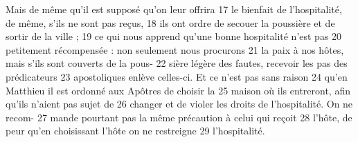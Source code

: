 Mais de même qu'il est supposé qu'on leur offrira	 
17	 	le bienfait de l'hospitalité, de même, s'ils ne sont pas reçus,	 
18	 	ils ont ordre de secouer la poussière et de sortir de la ville ;	 
19	 	ce qui nous apprend qu'une bonne hospitalité n'est pas	 
20	 	petitement récompensée : non seulement nous procurons	 
21	 	la paix à nos hôtes, mais s'ils sont couverts de la pous-	 
22	 	sière légère des fautes, recevoir les pas des prédicateurs	 
23	 	apostoliques enlève celles-ci. Et ce n'est pas sans raison	 
24	 	qu'en Matthieu il est ordonné aux Apôtres de choisir la	 
25	 	maison où ils entreront, afin qu'ils n'aient pas sujet de	 
26	 	changer et de violer les droits de l'hospitalité. On ne recom-	 
27	 	mande pourtant pas la même précaution à celui qui reçoit	 
28	 	l'hôte, de peur qu'en choisissant l'hôte on ne restreigne	 
29	 	l'hospitalité.